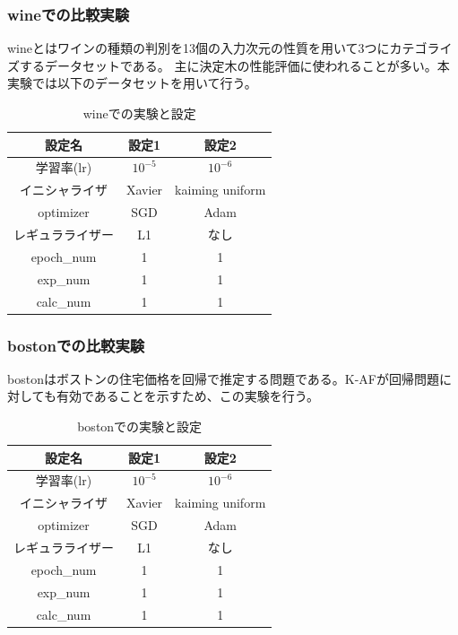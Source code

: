 \subsubsection{wineでの比較実験}
\label{impl:wine}

wineとはワインの種類の判別を13個の入力次元の性質を用いて3つにカテゴライズするデータセットである。
主に決定木の性能評価に使われることが多い。本実験では以下のデータセットを用いて行う。

\begin{table}[htbp]
    \begin{center}
        \caption{wineでの実験と設定}
        \vspace{5mm} 
        \begin{tabular}{ |c|c|c| }
        設定名 & 設定1 & 設定2 \\
        \hline
        学習率(lr)         & $ 10^{-5} $ & $ 10^{-6} $ \\
        イニシャライザ       & Xavier & kaiming uniform \\
        optimizer           & SGD & Adam \\
        レギュラライザー     & L1 & なし \\
        epoch\_num       & 1 &  1 \\
        exp\_num         & 1 & 1 \\
        calc\_num        & 1 & 1 \\
        \end{tabular}
    \end{center}
\end{table}


\subsubsection{bostonでの比較実験}
\label{impl:boston}

bostonはボストンの住宅価格を回帰で推定する問題である。K-AFが回帰問題に対しても有効であることを示すため、この実験を行う。

\begin{table}[htbp]
    \begin{center}
        \caption{bostonでの実験と設定}
        \vspace{5mm} 
        \begin{tabular}{ |c|c|c| }
        設定名 & 設定1 & 設定2 \\
        \hline
        学習率(lr)         & $ 10^{-5} $ & $ 10^{-6} $ \\
        イニシャライザ       & Xavier & kaiming uniform \\
        optimizer           & SGD & Adam \\
        レギュラライザー     & L1 & なし \\
        epoch\_num       & 1 &  1 \\
        exp\_num         & 1 & 1 \\
        calc\_num        & 1 & 1 \\
        \end{tabular}
    \end{center}
\end{table}


